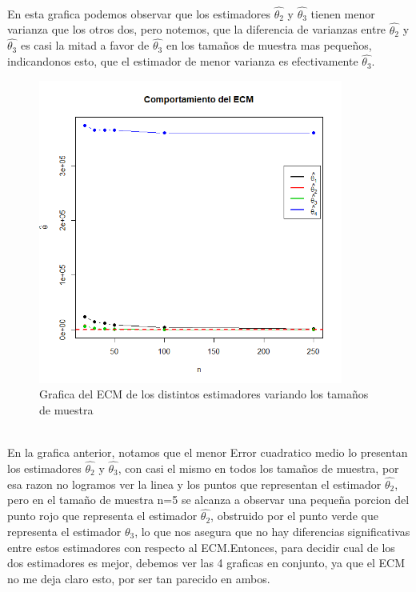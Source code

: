 \documentclass[letterpaper,12pt,onecolumn,titlepage]{article}
\begin{document}
~\\ En esta grafica podemos observar que los estimadores $\hat{\theta_2}$ y $\hat{\theta_3}$ tienen menor varianza que los otros dos, pero notemos, que la diferencia de varianzas entre $\hat{\theta_2}$ y $\hat{\theta_3}$ es casi la mitad a favor de $\hat{\theta_3}$ en los tama\~{n}os de muestra mas peque\~{n}os, indicandonos esto, que el estimador de menor varianza es efectivamente $\hat{\theta_3}$.
\pagebreak \begin{figure}[!h]
    \begin{center}
        \includegraphics[width=10cm]{Figuras/ECM.png}
        \caption{Grafica del ECM de los distintos estimadores variando los tama\~{n}os de muestra}
        \label{fig:Densidad}
    \end{center}
\end{figure}
~\\ En la grafica anterior, notamos que el menor Error cuadratico medio lo presentan los estimadores $\hat{\theta_2}$ y $\hat{\theta_3}$, con casi el mismo en todos los tama\~{n}os de muestra, por esa razon no logramos ver la linea y los puntos que representan el estimador $\hat{\theta_2}$, pero en el tama\~{n}o de muestra n=5 se alcanza a observar una peque\~{n}a porcion del punto rojo que representa el estimador $\hat{\theta_2}$, obstruido por el punto verde que representa el estimador $\hat{\theta_3}$, lo que nos asegura que no hay diferencias significativas entre estos estimadores con respecto al ECM.Entonces, para decidir cual de los dos estimadores es mejor, debemos ver las 4 graficas en conjunto, ya que el ECM no me deja claro esto, por ser tan parecido en ambos.
\end{document}
